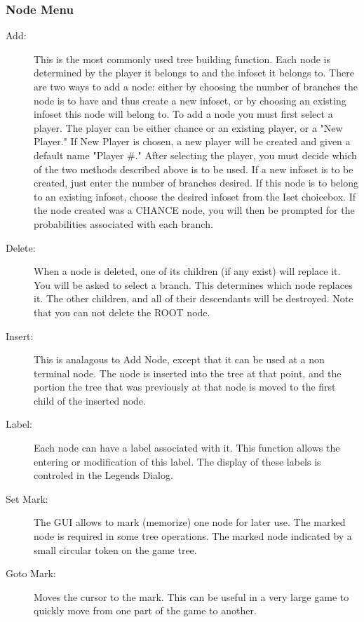 \subsubsection{Node Menu}
\begin{description}
\item[Add:] This is the most commonly used tree building
function.  Each node is determined by the player it belongs to and the
infoset it belongs to.  There are two ways to add a node: either by
choosing the number of branches the node is to have and thus create a new
infoset, or by choosing an existing infoset this node will belong to.  To
add a node you must first select a player.  The player can be either
chance or an existing player, or a "New Player."  If New Player is chosen,
a new player will be created and given a default name "Player \#." After
selecting the player, you must decide which of the two methods described
above is to be used.  If a new infoset is to be created, just enter the
number of branches desired.  If this node is to belong to an existing
infoset, choose the desired infoset from the Iset choicebox.  If the node
created was a CHANCE node, you will then be prompted for the probabilities
associated with each branch.
\item[Delete:]  When a node is deleted, one of its children (if any
exist) will replace it.  You will be asked to select a branch.  This determines which 
node replaces it.  The other children, and all of their descendants will be destroyed.  
Note that you can not delete the ROOT node.
\item[Insert:] This is analagous to Add Node, except that it can be used at a 
non terminal node.  The node is inserted into the tree at that point, and the portion 
the tree that was previously at that node is moved to the first child 
of the inserted node. 
\item[Label:]  Each node can have a label associated with it. 
This function allows the entering or modification of this label.  The
display of these labels is controled in the Legends Dialog.
\item[Set Mark:]  The GUI allows to mark (memorize) one
node for later use.  The marked node is required in some tree operations. 
The marked node indicated by a small circular token 
on the game tree.  
\item[Goto Mark:]  Moves the cursor to the mark.  This can be useful in a 
very large game to quickly move from one part of the game to another. 
\end{description}

